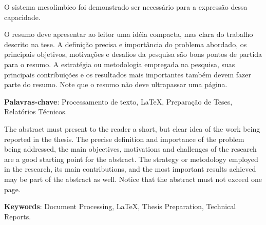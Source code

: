 O sistema mesolimbico foi demonstrado ser necessário para a expressão dessa capacidade.




O resumo deve apresentar ao leitor uma idéia compacta, mas clara do
trabalho descrito na tese. A definição precisa e importância do
problema abordado, os principais objetivos, motivações e desafios da
pesquisa são bons pontos de partida para o resumo. A estratégia ou
metodologia empregada na pesquisa, suas principais contribuições e os
resultados mais importantes também devem fazer parte do resumo. Note
que o resumo não deve ultrapassar uma página.

\vspace{1.5ex}

{\bf Palavras-chave}: Processamento de texto, \LaTeX,
Preparação de Teses, Relatórios Técnicos.
%
%


The abstract must present to the reader a short, but clear idea of the
work being reported in the thesis. The precise definition and
importance of the problem being addressed, the main objectives,
motivations and challenges of the research are a good starting point
for the abstract. The strategy or metodology employed in the research,
its main contributions, and the most important results achieved may be
part of the abstract as well. Notice that the
abstract must not exceed one page.

\vspace{1.5ex}

{\bf Keywords}: Document Processing, \LaTeX, Thesis Preparation,
Technical Reports.
